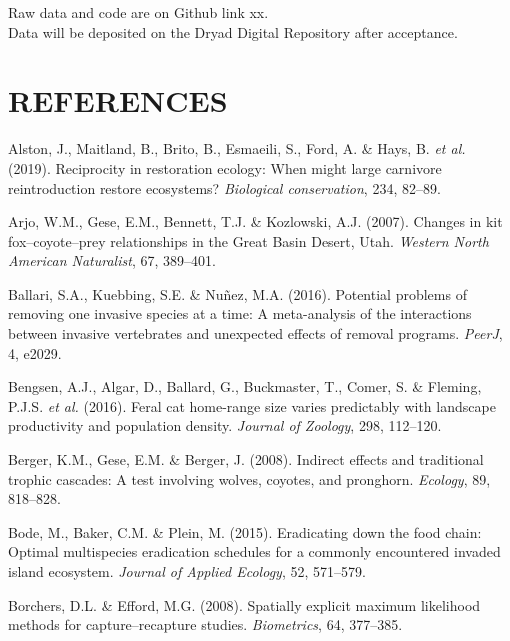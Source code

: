 \documentclass[]{elsarticle} %
\begin{document}
Raw data and code are on Github link xx.\\
Data will be deposited on the Dryad Digital Repository after acceptance.

\newpage

\hypertarget{references}{%
\section*{REFERENCES}\label{references}}

\hypertarget{refs}{}
\leavevmode\hypertarget{ref-alston2019}{}%
Alston, J., Maitland, B., Brito, B., Esmaeili, S., Ford, A. \& Hays, B. \emph{et al.} (2019). Reciprocity in restoration ecology: When might large carnivore reintroduction restore ecosystems? \emph{Biological conservation}, 234, 82--89.

\leavevmode\hypertarget{ref-arjo2007}{}%
Arjo, W.M., Gese, E.M., Bennett, T.J. \& Kozlowski, A.J. (2007). Changes in kit fox--coyote--prey relationships in the Great Basin Desert, Utah. \emph{Western North American Naturalist}, 67, 389--401.

\leavevmode\hypertarget{ref-ballari2016}{}%
Ballari, S.A., Kuebbing, S.E. \& Nuñez, M.A. (2016). Potential problems of removing one invasive species at a time: A meta-analysis of the interactions between invasive vertebrates and unexpected effects of removal programs. \emph{PeerJ}, 4, e2029.

\leavevmode\hypertarget{ref-https:ux2fux2fdoi.orgux2f10.1111ux2fjzo.12290}{}%
Bengsen, A.J., Algar, D., Ballard, G., Buckmaster, T., Comer, S. \& Fleming, P.J.S. \emph{et al.} (2016). Feral cat home-range size varies predictably with landscape productivity and population density. \emph{Journal of Zoology}, 298, 112--120.

\leavevmode\hypertarget{ref-berger2008indirect}{}%
Berger, K.M., Gese, E.M. \& Berger, J. (2008). Indirect effects and traditional trophic cascades: A test involving wolves, coyotes, and pronghorn. \emph{Ecology}, 89, 818--828.

\leavevmode\hypertarget{ref-bode2015}{}%
Bode, M., Baker, C.M. \& Plein, M. (2015). Eradicating down the food chain: Optimal multispecies eradication schedules for a commonly encountered invaded island ecosystem. \emph{Journal of Applied Ecology}, 52, 571--579.

\leavevmode\hypertarget{ref-borchers2008}{}%
Borchers, D.L. \& Efford, M.G. (2008). Spatially explicit maximum likelihood methods for capture--recapture studies. \emph{Biometrics}, 64, 377--385.
\end{document}
